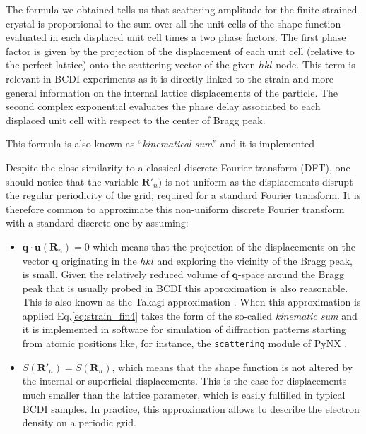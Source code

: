 The formula we obtained tells us that scattering amplitude for the finite strained crystal is proportional to the 
sum over all the unit cells of the shape function evaluated in each displaced unit cell times a two phase factors. 
The first phase factor is given by the projection of the displacement of each unit cell (relative to the perfect lattice) 
onto the scattering vector of the given $hkl$ node. This term is relevant in BCDI experiments as it is directly linked to 
the strain and more general information on the internal lattice displacements of the particle. 
The second complex exponential evaluates the phase delay associated to each displaced unit cell with respect to the 
center of Bragg peak. 

This formula is also known as ``\textit{kinematical sum}'' and it is implemented 

Despite the close similarity to a classical discrete Fourier transform (DFT), one should notice that the variable $\mathbf{R}'_n)$ 
is not uniform as the displacements disrupt the regular periodicity of the grid, required for a standard Fourier transform. 
It is therefore common to approximate this non-uniform discrete Fourier transform with a standard discrete one by assuming: 

\begin{itemize}

    \item $\mathbf{q}\cdot\mathbf{u}(\mathbf{R}_n) = 0 $ which means that the projection of the displacements on the vector 
    $\mathbf{q}$ originating in the $hkl$ and exploring the vicinity of the Bragg peak, is small. Given the relatively 
    reduced volume of $\mathbf{q}$-space around the Bragg peak that is usually probed in BCDI this approximation is 
    also reasonable. This is also known as the Takagi approximation \cite{takagi1969dynamical}. When this approximation is applied Eq.\ref{eq:strain_fin4} takes the form of the so-called \textit{kinematic sum}
    and it is implemented in software for simulation of diffraction 
    patterns starting from atomic positions like, for instance, the \texttt{scattering} module of PyNX \cite{pynx_scattering}. 

    \item $ S(\mathbf{R}'_n) = S(\mathbf{R}_n)$, which means that the shape function is not altered by the internal or superficial 
    displacements. This is the case for displacements much smaller than the lattice parameter, which is easily fulfilled in 
    typical BCDI samples. In practice, this approximation allows to describe the electron density on a periodic grid. 
     
\end{itemize}

